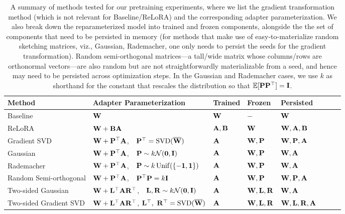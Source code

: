 \begin{table*}[t]
\footnotesize
\centering
\vcram{-2mm}
\begin{tabular}{lllllclc}
\toprule
Method                 & Adapter Parameterization & Trained & Frozen & Persisted   \\ \midrule
Baseline                  & ${\mathbf{W}}$ & ${\mathbf{W}}$ & $-$ &   ${\mathbf{W}}$ \\
ReLoRA \cite{relora} & ${\mathbf{W}} + {\mathbf{B}}{\mathbf{A}}$ & ${\mathbf{A}},{\mathbf{B}}$ &  ${\mathbf{W}}$ &  ${\mathbf{W}}, {\mathbf{A}}, {\mathbf{B}}$  &   \\                           

Gradient SVD \citep[GaLore; ][]{galore} & ${\mathbf{W}} + {\mathbf{P}}^\top{\mathbf{A}}$, \,\, ${\mathbf{P}}^\top = \operatorname{SVD}(\overline{{\mathbf{W}}})$ & ${\mathbf{A}}$ & ${\mathbf{W}},{\mathbf{P}}$ & ${\mathbf{W}}, {\mathbf{P}}, {\mathbf{A}}$                               \\
Gaussian \citep[Flora;][]{hao2024flora} &           ${\mathbf{W}} + {\mathbf{P}}^\top{\mathbf{A}}$, \,\,  ${\mathbf{P}} \sim k \mathcal{N}(\mathbf{0}, \mathbf{I})$ & ${\mathbf{A}}$ & ${\mathbf{W}},{\mathbf{P}}$ & ${\mathbf{W}}, {\mathbf{A}}$          \\ 
Rademacher &  ${\mathbf{W}} + {\mathbf{P}}^\top{\mathbf{A}}$, \,\,  ${\mathbf{P}} \sim k \operatorname{Unif}(\{-\mathbf{1}, \mathbf{1}\})$ & ${\mathbf{A}}$ & ${\mathbf{W}},{\mathbf{P}}$ & ${\mathbf{W}}, {\mathbf{A}}$                \\ 
Random Semi-orthogonal      &  ${\mathbf{W}} + {\mathbf{P}}^\top{\mathbf{A}}$, \,\,  ${\mathbf{P}}^\top {\mathbf{P}} = k{\mathbf{I}}$ & ${\mathbf{A}}$ & ${\mathbf{W}},{\mathbf{P}}$   & ${\mathbf{W}},{\mathbf{P}},{\mathbf{A}}$          \\ 
Two-sided Gaussian &  ${\mathbf{W}} + {\mathbf{L}}^\top{\mathbf{A}}{\mathbf{R}}^\top$,  \,\,  ${\mathbf{L}}, {\mathbf{R}} \sim k \mathcal{N}(\mathbf{0},\mathbf{I})$ & ${\mathbf{A}}$ & ${\mathbf{W}}, {\mathbf{L}},{\mathbf{R}}$ & ${\mathbf{W}}, {\mathbf{A}}$        \\
Two-sided Gradient SVD &  ${\mathbf{W}} + {\mathbf{L}}^\top{\mathbf{A}}{\mathbf{R}}^\top$, ${\mathbf{L}}^\top, \,\,   {\mathbf{R}}^\top = \operatorname{SVD}(\overline{{\mathbf{W}}})$ & ${\mathbf{A}}$ & ${\mathbf{W}},{\mathbf{L}},{\mathbf{R}}$ & ${\mathbf{W}}, {\mathbf{L}}, {\mathbf{R}}, {\mathbf{A}}$        \\
\bottomrule
\end{tabular}
\vcram{-2mm}
\caption{A summary of methods tested for our pretraining experiments, where we list the gradient transformation method (which is not relevant for Baseline/ReLoRA) and the corresponding adapter parameterization. We also break down the reparameterized model into trained and frozen components, alongside the the set of components that need to be persisted in memory (for methods that make use of easy-to-materialize random sketching matrices, viz., Gaussian, Rademacher, one only needs to persist the seeds for the gradient transformation). Random semi-orthogonal matrices---a tall/wide  matrix whose columns/rows are orthonormal vectors---are also random but are not straightforwardly materializable from a seed, and hence may need to be persisted across optimization steps. In the Gaussian and Rademacher cases, we use $k$ as shorthand for the constant that rescales the distribution so that $\operatorname{\mathbb{E}}[{\mathbf{P}} {\mathbf{P}}^\top] = {\mathbf{I}}$.
}
\label{tab:methods}
\vcram{-4mm}
\end{table*}
